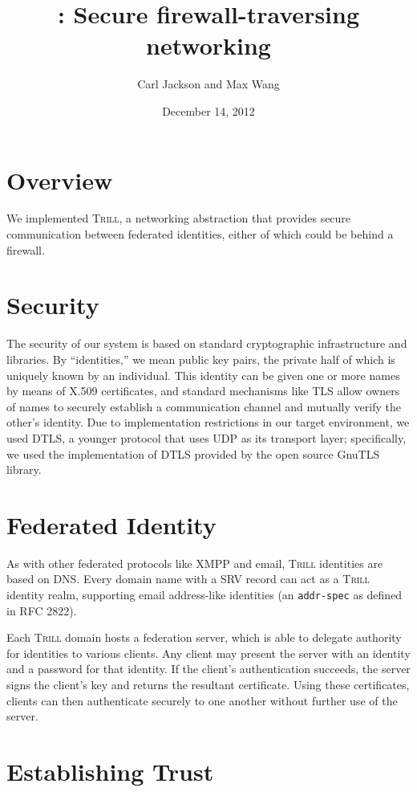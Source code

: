 \documentclass[12pt]{article}
\title{\Trill: Secure firewall-traversing networking}
\author{Carl Jackson and Max Wang}
\date{December 14, 2012}
\makeatletter
\newcommand{\Trill}{\textsc{Trill}\xspace}
\renewcommand{\maketitle}{%
  \thispagestyle{plain}%
  \begin{center}%
    {\LARGE \@title \par}%
    {\large \@author \par}%
    {\large \@date \par}%
  \end{center}%
}
\makeatother
\begin{document}
\maketitle

\section*{Overview}
We implemented \Trill, a networking abstraction that provides secure
communication between federated identities, either of which could be behind a
firewall.

\section*{Security}
The security of our system is based on standard cryptographic infrastructure and
libraries. By ``identities,'' we mean public key pairs, the private half of
which is uniquely known by an individual. This identity can be given one or more
names by means of X.509 certificates, and standard mechanisms like TLS allow
owners of names to securely establish a communication channel and mutually
verify the other's identity. Due to implementation restrictions in our target
environment, we used DTLS, a younger protocol that uses UDP as its transport
layer; specifically, we used the implementation of DTLS provided by the open
source GnuTLS library.

\section*{Federated Identity}
As with other federated protocols like XMPP and email, \Trill identities are
based on DNS.  Every domain name with a SRV record can act as a \Trill identity
realm, supporting email address-like identities (an \verb!addr-spec!  as defined
in RFC 2822).

Each \Trill domain hosts a federation server, which is able to delegate
authority for identities to various clients.  Any client may present the server
with an identity and a password for that identity.  If the client's
authentication succeeds, the server signs the client's key and returns the
resultant certificate.  Using these certificates, clients can then authenticate
securely to one another without further use of the server.

\section*{Establishing Trust}
\end{document}
